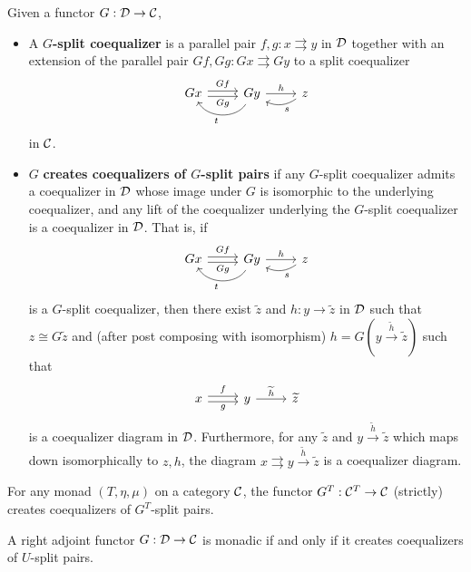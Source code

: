 \documentclass[12pt]{article}
\begin{document}
\begin{defn}
    Given a functor $G: \mathcal{D} \to \mathcal{C}$,
    \begin{itemize}
        \item A \textbf{$G$-split coequalizer} is a parallel pair $f,g: x\rightrightarrows y$ in $\mathcal{D}$ together with an extension of the parallel pair $Gf,Gg: Gx\rightrightarrows Gy$ to a split coequalizer
        \[\begin{tikzcd}
        Gx \rar[shift left=0.5ex, "Gf"] \rar[shift right=0.5ex, "Gg"'] & Gy \rar["h"] \lar[bend left=60, "t"] & z \lar[bend left, "s"]
        \end{tikzcd}\]
        in $\mathcal{C}$.

        \item $G$ \textbf{creates coequalizers of $G$-split pairs} if any $G$-split coequalizer admits a coequalizer in $\mathcal{D}$ whose image under $G$ is isomorphic to the underlying coequalizer, and any lift of the coequalizer underlying the $G$-split coequalizer is a coequalizer in $\mathcal{D}$. That is, if
        \[\begin{tikzcd}
        Gx \rar[shift left=0.5ex, "Gf"] \rar[shift right=0.5ex, "Gg"'] & Gy \rar["h"] \lar[bend left=60, "t"] & z \lar[bend left, "s"]
        \end{tikzcd}\]
        is a $G$-split coequalizer, then there exist $\tilde{z}$ and $h:y\to \tilde{z}$ in $\mathcal{D}$ such that $z\cong G\tilde{z}$ and (after post composing with isomorphism) $h=G(y\xrightarrow{\tilde{h}} \tilde{z})$ such that
        \[\begin{tikzcd}
        x \rar[shift left=0.5ex, "f"] \rar[shift right=0.5ex, "g"'] & y \rar["\tilde{h}"] & \tilde{z}
        \end{tikzcd}\]
        is a coequalizer diagram in $\mathcal{D}$. Furthermore, for any $\tilde{z}$ and $y \xrightarrow{\tilde{h}} \tilde{z}$ which maps down isomorphically to $z,h$, the diagram $x\rightrightarrows y \xrightarrow{\tilde{h}} \tilde{z}$ is a coequalizer diagram.
    \end{itemize}
\end{defn}

\begin{prop}
    For any monad $(T,\eta,\mu)$ on a category $\mathcal{C}$, the functor $G^T: \mathcal{C}^T \to \mathcal{C}$ (strictly) creates coequalizers of $G^T$-split pairs.
\end{prop}

\begin{thm}
    A right adjoint functor $G: \mathcal{D} \to \mathcal{C}$ is monadic if and only if it creates coequalizers of $U$-split pairs.
\end{thm}
\end{document}
